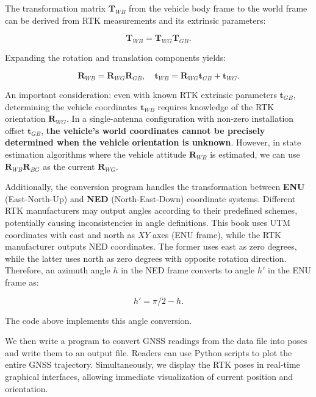 The transformation matrix $\bm{T}_{WB}$ from the vehicle body frame to the world frame can be derived from RTK measurements and its extrinsic parameters:

\begin{equation}\label{key}
	\bm{T}_{WB} = \bm{T}_{WG} \bm{T}_{GB}.
\end{equation}

Expanding the rotation and translation components yields:

\begin{equation}\label{key}
	\bm{R}_{WB} = \bm{R}_{WG} \bm{R}_{GB}, \quad \bm{t}_{WB} = \bm{R}_{WG} \bm{t}_{GB} + \bm{t}_{WG}.
\end{equation}

An important consideration: even with known RTK extrinsic parameters $\bm{t}_{GB}$, determining the vehicle coordinates $\bm{t}_{WB}$ requires knowledge of the RTK orientation $\bm{R}_{WG}$. In a single-antenna configuration with non-zero installation offset $\bm{t}_{GB}$, \textbf{the vehicle's world coordinates cannot be precisely determined when the vehicle orientation is unknown}. However, in state estimation algorithms where the vehicle attitude $\bm{R}_{WB}$ is estimated, we can use $\bm{R}_{WB} \bm{R}_{BG}$ as the current $\bm{R}_{WG}$.

Additionally, the conversion program handles the transformation between \textbf{ENU} (East-North-Up) and \textbf{NED} (North-East-Down) coordinate systems. Different RTK manufacturers may output angles according to their predefined schemes, potentially causing inconsistencies in angle definitions. This book uses UTM coordinates with east and north as $XY$ axes (ENU frame), while the RTK manufacturer outputs NED coordinates. The former uses east as zero degrees, while the latter uses north as zero degrees with opposite rotation direction. Therefore, an azimuth angle $h$ in the NED frame converts to angle $h'$ in the ENU frame as:

\begin{equation}\label{key}
	h' = \pi/2 - h.
\end{equation}

The code above implements this angle conversion.

We then write a program to convert GNSS readings from the data file into poses and write them to an output file. Readers can use Python scripts to plot the entire GNSS trajectory. Simultaneously, we display the RTK poses in real-time graphical interfaces, allowing immediate visualization of current position and orientation.

